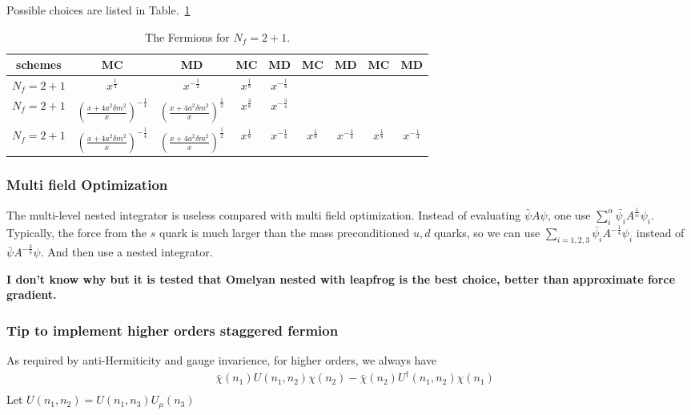 Possible choices are listed in Table.~\ref{table:nf2p1staggered}
\begin{table}[ht]
\begin{tabular}{ c || c c | c c | c c| c c}
  schemes & MC & MD & MC & MD & MC & MD & MC & MD \\
  \hline
  $N_f=2+1$ & $x^{\frac{1}{4}}$  & $x^{-\frac{1}{2}}$ & $x^{\frac{1}{8}}$ & $x^{-\frac{1}{4}}$ & & & & \\
  $N_f=2+1$ & $\left(\frac{x+4a^2\delta m^2}{x}\right)^{-\frac{1}{4}}$  & $\left(\frac{x+4a^2\delta m^2}{x}\right)^{\frac{1}{2}}$ & $x^{\frac{3}{8}}$ & $x^{-\frac{3}{4}}$ & & & & \\
  $N_f=2+1$ & $\left(\frac{x+4a^2\delta m^2}{x}\right)^{-\frac{1}{4}}$  & $\left(\frac{x+4a^2\delta m^2}{x}\right)^{\frac{1}{2}}$ & $x^{\frac{1}{8}}$ & $x^{-\frac{1}{4}}$ & $x^{\frac{1}{8}}$ & $x^{-\frac{1}{4}}$ & $x^{\frac{1}{8}}$ & $x^{-\frac{1}{4}}$ \\
  \hline
\end{tabular}
\caption{The Fermions for $N_f=2+1$.}
\label{table:nf2p1staggered}
\end{table}

\subsubsection{\label{sec:multifieldOptimization}Multi field Optimization}

The multi-level nested integrator is useless compared with multi field optimization. Instead of evaluating $\bar{\psi} A \psi$, one use $\sum _i^{\alpha} \bar{\psi _i} A^{\frac{1}{\alpha}} \psi _i$. Typically, the force from the $s$ quark is much larger than the mass preconditioned $u,d$ quarks, so we can use $\sum _{i=1,2,3} \bar{\psi _i} A^{-\frac{1}{4}} \psi _i$ instead of $\bar{\psi} A^{-\frac{3}{4}} \psi$. And then use a nested integrator.

\textbf{\textcolor[rgb]{0,0,1}{I don't know why but it is tested that Omelyan nested with leapfrog is the best choice, better than approximate force gradient.}}

\subsubsection{\label{sec:TipToImplementHigherOrdersStaggeredFermion}Tip to implement higher orders staggered fermion}

As required by anti-Hermiticity and gauge invarience, for higher orders, we always have
\begin{equation}
\begin{split}
&\bar{\chi}(n_1)U(n_1,n_2)\chi (n_2) - \bar{\chi}(n_2)U^{\dagger}(n_1,n_2)\chi (n_1)\\
\end{split}
\end{equation}
Let $U(n_1,n_2)=U(n_1,n_3)U_{\mu}(n_3)$ 